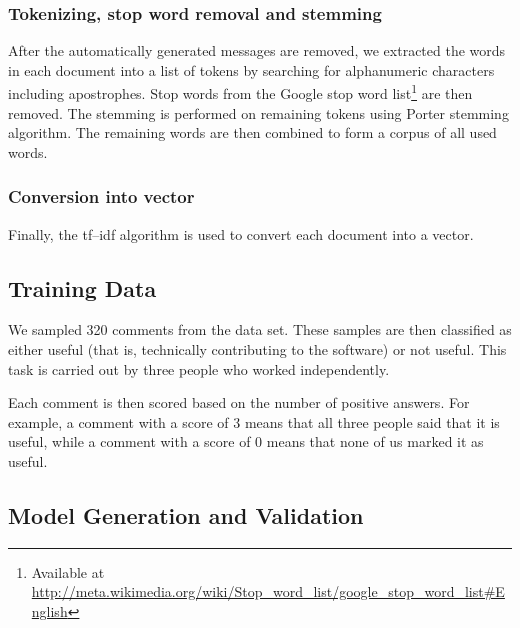 \documentclass[conference]{IEEEtran}
\begin{document}
\subsubsection{Tokenizing, stop word removal and stemming}

After the automatically generated messages are removed, we extracted the words in each document into a list of tokens by searching for alphanumeric characters including apostrophes.
Stop words from the Google stop word list\footnote{Available at \url{http://meta.wikimedia.org/wiki/Stop_word_list/google_stop_word_list#English}} are then removed.
The stemming is performed on remaining tokens using Porter stemming algorithm.
The remaining words are then combined to form a corpus of all used words.

\subsubsection{Conversion into vector}

Finally, the tf--idf algorithm is used to convert each document into a vector.


\subsection{Training Data}

We sampled 320 comments from the data set.
These samples are then classified as either useful (that is, technically contributing to the software) or not useful.
This task is carried out by three people who worked independently.

Each comment is then scored based on the number of positive answers.
For example, a comment with a score of 3 means that all three people said that it is useful,
while a comment with a score of 0 means that none of us marked it as useful.



\subsection{Model Generation and Validation}
\end{document}
